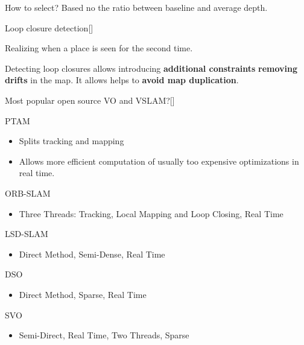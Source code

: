 \documentclass[10pt,a4paper]{scrartcl}
\begin{document}
\begin{multicols*}{2}
\begin{QandA}
\item How to select? Based no the ratio between baseline and average depth.
\end{QandA}

\begin{QandA}{Loop closure detection}[\Definition]
\item Realizing when a place is seen for the second time.
\item Detecting loop closures allows introducing \textbf{additional constraints} \textbf{removing drifts} in the map. It allows helps to \textbf{avoid map duplication}.
\end{QandA}

\begin{QandA}{Most popular open source VO and VSLAM?}[\Comparison]
\item[(VSLAM)] PTAM
\begin{itemize}
\item Splits tracking and mapping
\item Allows more efficient computation of usually too expensive optimizations in real time.
\end{itemize}
\item[(VSLAM)] ORB-SLAM
\begin{itemize}
\item Three Threads: Tracking, Local Mapping and Loop Closing, Real Time
\end{itemize}
\item[(VSLAM)] LSD-SLAM
\begin{itemize}
\item Direct Method, Semi-Dense, Real Time
\end{itemize}
\item[(VO)] DSO
\begin{itemize}
\item Direct Method, Sparse, Real Time
\end{itemize}
\item[(VO)] SVO
\begin{itemize}
\item Semi-Direct, Real Time, Two Threads, Sparse
\end{itemize}
\end{QandA}


\end{multicols*}
\end{document}
